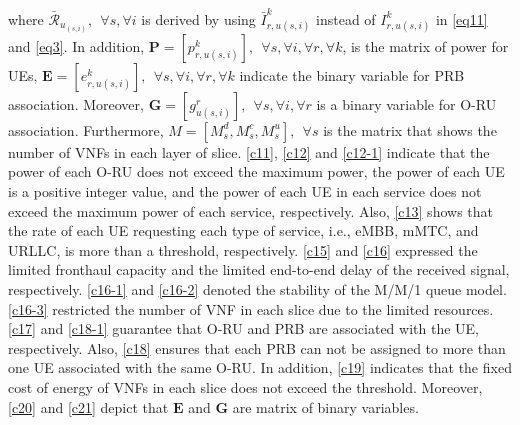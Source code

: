 \documentclass[lettersize,journal]{IEEEtran}
\begin{document}
\noindent where $\bar{\mathcal{R}}_{u_{(s,i)}}, \:\:\forall s , \forall i$ is derived by using $\bar{I}_{r,u(s,i)}^{k}$ instead of $I_{r,u(s,i)}^{k}$ in  \eqref{eq11} and \eqref{eq3}.
In addition, $\boldsymbol{P} =[p_{r,u(s,i)}^{k}], \:\: \forall s , \forall i, \forall r, \forall k $, is the matrix of power for UEs, $\boldsymbol{E} =[e_{r,u(s,i)}^k], \:\: \forall s , \forall i, \forall r, \forall k$ indicate the binary variable for PRB association. Moreover, $\boldsymbol{G} =[g_{u(s,i)}^r], \:\: \forall s , \forall i, \forall r$ is a binary variable for O-RU association. Furthermore, $M = [M_s^d, M_s^c, M_s^u], \:\: \forall s$ is the matrix that shows the number of VNFs in each layer of slice.
\eqref{c11}, \eqref{c12} and \eqref{c12-1} indicate that the power of each O-RU does not exceed the maximum power, the power of each UE is a positive integer value, and the power of each UE in each service does not exceed the maximum power of each service, respectively.  
Also, \eqref{c13} shows that the rate of each UE requesting each type of service, i.e., eMBB, mMTC, and URLLC, is more than a threshold, respectively.
\eqref{c15} and \eqref{c16} expressed the limited fronthaul capacity and the limited end-to-end delay of the received signal, respectively.
\eqref{c16-1} and \eqref{c16-2} denoted the stability of the M/M/1 queue model.
\eqref{c16-3} restricted the number of VNF in each slice due to the limited resources.
\eqref{c17} and \eqref{c18-1} guarantee that O-RU and PRB are associated with the UE, respectively.
Also, \eqref{c18} ensures that each PRB can not be assigned to more than one UE associated with the same O-RU.
In addition, \eqref{c19} indicates that the fixed cost of energy of VNFs in each slice does not exceed the threshold. 
Moreover, \eqref{c20} and \eqref{c21} depict that $\boldsymbol{E}$ and $\boldsymbol{G}$ are matrix of binary variables.
\end{document}
